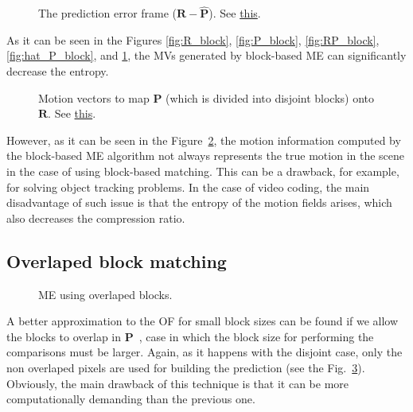 \begin{figure}
  \centering
  \caption{The prediction error frame (${\mathbf R} - {\hat{\mathbf P}}$). See \href{https://github.com/Sistemas-Multimedia/Sistemas-Multimedia.github.io/blob/master/milestones/10-ME/full_search_block_ME.ipynb}{this}.}
  \label{fig:error_block}
\end{figure}

As it can be seen in the Figures \ref{fig:R_block}, \ref{fig:P_block},
\ref{fig:RP_block}, \ref{fig:hat_P_block}, and \ref{fig:error_block}, the MVs generated
by block-based ME can significantly decrease the entropy.

\begin{figure}
  \centering
  \caption{Motion vectors to map ${\mathbf P}$ (which is divided into disjoint blocks) onto ${\mathbf R}$. See \href{https://github.com/Sistemas-Multimedia/Sistemas-Multimedia.github.io/blob/master/milestones/10-ME/full_search_block_ME.ipynb}{this}.}
  \label{fig:MVs_block}
\end{figure}

However, as it can be seen in the Figure~\ref{fig:MVs_block}, the
motion information computed by the block-based ME algorithm not always
represents the true motion in the scene in the case of using
block-based matching. This can be a drawback, for example, for solving
object tracking problems. In the case of video coding, the main
disadvantage of such issue is that the entropy of the motion fields
arises, which also decreases the compression ratio.

\subsection{Overlaped block matching}

\begin{figure}
  \centering
  \caption{ME using overlaped blocks.}
  \label{fig:overlaped}
\end{figure}

A better approximation to the OF for small block sizes can be found if
we allow the blocks to overlap in ${\mathbf
  P}$~\cite{orchard1994overlapped}, case in which the block size for
performing the comparisons must be larger. Again, as it happens with
the disjoint case, only the non overlaped pixels are used for building
the prediction (see the Fig.~\ref{fig:overlaped}). Obviously, the main
drawback of this technique is that it can be more computationally
demanding than the previous one.

